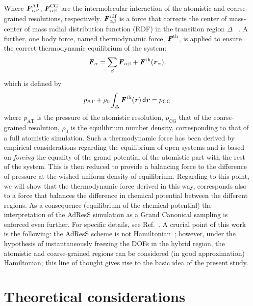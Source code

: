 \documentclass[aip,jcp,a4paper,reprint,onecolumn]{revtex4-1}
\newcommand{\vect}[1]{\textbf{\textit{#1}}}
\newcommand{\dd}[1]{\textsf{#1}}
\newcommand{\AT}{{\textrm{{AT}}}}
\newcommand{\CG}{{\textrm{CG}}}
\newcommand{\rdf}{{\textrm{rdf}}}
\begin{document}
Where $ \vect F^{\AT}_{\alpha\beta}$, $ \vect F^{\CG}_{\alpha\beta}$
are the intermolecular interaction of the atomistic and coarse-grained
resolutions, respectively.  $\vect F_{\alpha\beta}^{\rdf}$ is a force that corrects the center of mass-center of mass radial distribution function (RDF) in the transition region $\Delta$ ~\cite{rdfcorr}. A further, one body force, named thermodynamic force, ${\vect F}^{\textrm{th}}$, is applied to ensure the correct thermodynamic equilibrium of the system:
\begin{equation}
  {\vect F}_{\alpha}=
  \sum_{\beta}{\vect F}_{\alpha\beta}+
  {\vect F}^{\textrm{th}}(\vect r_\alpha).
\label{mody}
\end{equation}
which is defined by
\begin{equation}
  p_{\AT}+
  \rho_0
  \int_{\Delta} {\vect F}^\text{th}(\vect r)\,\dd d\vect r
  =p_{\CG}
  \label{thf}
\end{equation}
where $p_{\AT}$ is the pressure of the atomistic resolution, $p_{\CG}$ that of the coarse-grained resolution, $\rho_{0}$ is the equilibrium number density, corresponding to that of a full atomistic simulation.
Such a thermodynamic force has been derived by empirical considerations regarding the equilibrium of open systems and is based on {\it forcing} the equality of the grand potential of the atomistic part with the rest of the system.
This is then reduced to provide a balancing force to the difference of pressure at the wished uniform density of equilibrium. Regarding to this point, we will show that the thermodynamic force derived in this way, corresponds also to a force that balances the difference in chemical potential between the different regions. As a consequence (equilibrium of the chemical potential) the interpretation of the AdResS simulation as a Grand Canonical sampling is enforced even further.
For specific details, see Ref.~\cite{prlgc}. A crucial point of this work is the following: the 
AdResS scheme is not Hamiltonian~\cite{presolo,prlcomm}; however, under the hypothesis of instantaneously
freezing the DOFs in the hybrid region, the atomistic and
coarse-grained regions can be considered (in good approximation) Hamiltonian; this line of thought gives rise to the basic
idea of the present study.

\section{Theoretical considerations}
\end{document}

